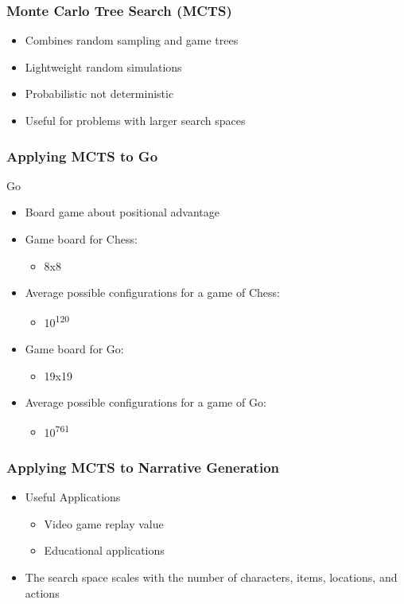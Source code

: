 \documentclass{beamer}
\begin{document}
\begin{frame}
\frametitle{Monte Carlo Tree Search (MCTS)}
\begin{itemize}
	\item Combines random sampling and game trees
	\item Lightweight random simulations
	\item Probabilistic not deterministic
	\item Useful for problems with larger search spaces
\end{itemize}
\end{frame}

\begin{frame}
\frametitle{Applying MCTS to Go}
Go
\begin{itemize}
	\item Board game about positional advantage
	\item Game board for Chess:
	\begin{itemize}
		\item 8x8
	\end{itemize}
	\item Average possible configurations for a game of Chess: 
	\begin{itemize}
		\item 10\textsuperscript{120}
	\end{itemize}
	\item Game board for Go: 
	\begin{itemize}
		\item 19x19
	\end{itemize}
	\item Average possible configurations for a game of Go: 
	\begin{itemize}
		\item 10\textsuperscript{761}
	\end{itemize}
\end{itemize}
\end{frame}


\begin{frame}
\frametitle{Applying MCTS to Narrative Generation}
\begin{itemize}
	\item Useful Applications
	\begin{itemize}
		\item Video game replay value
		\item Educational applications
	\end{itemize}
	\item The search space scales with the number of characters, items, locations, and actions
\end{itemize}
\end{frame}
\end{document}
